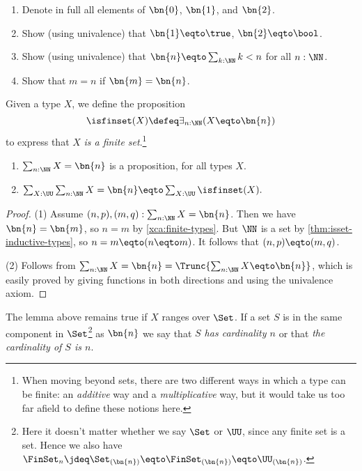 \begin{xca}\label{xca:finite-types}
\hspace{1in}
  \begin{enumerate}
  \item Denote in full all elements of $\bn{0}$, $\bn{1} $, and $\bn{2}$.
  \item Show (using univalence) that $\bn{1} \eqto \true$, $\bn{2} \eqto \bool$.
  \item Show (using univalence) that $\bn{n} \eqto \sum_{k:\NN} k<n$ for all $n:\NN$.
  \item Show that $m=n$ if $\bn{m}=\bn{n}$.\qedhere
  \end{enumerate}
\end{xca}
\begin{definition}\label{def:is-finite}
  Given a type $X$, we define the proposition
  \[
    \textstyle
    \isfinset(X) \defeq \exists_{n:\NN}(X \eqto \bn{n})
  \]
  to express that $X$ \emph{is a finite set}.\footnote{%
    When moving beyond sets, there are two different ways
    in which a type can be finite: an \emph{additive}
    way and a \emph{multiplicative} way, but
    it would take us too far afield to define these notions
    here.} %
\end{definition}
\begin{lemma}\label{lem:maxonefinitetype}
\leavevmode
\begin{enumerate}
  \item $\sum_{n:\NN} X=\bn{n}$ is a proposition, for all types $X$.
  \item
  $\sum_{X:\UU}\sum_{n:\NN} {X=\bn{n}} \eqto \sum_{X:\UU}\isfinset(X).$
  \end{enumerate}
\end{lemma}
\begin{proof}

(1) Assume $(n,p),(m,q): \sum_{n:\NN}{X=\bn{n}}$.
Then we have ${\bn{n}=\bn{m}}$, so ${n=m}$
by \cref{xca:finite-types}. But $\NN$ is a set by \cref{thm:isset-inductive-types},
so ${n=m} \eqto (n \eqto m)$. It follows that $(n,p) \eqto (m,q)$.

(2) Follows from $\sum_{n:\NN} {X=\bn{n}} =\Trunc{\sum_{n:\NN}X \eqto \bn{n}}$,
which is easily proved by giving functions in both directions and using the univalence axiom.
\end{proof}

The lemma above remains true if $X$ ranges over $\Set$.
If a set $S$ is in the same component in $\Set$\footnote{%
  Here it doesn't matter whether we say $\Set$ or $\UU$,
  since any finite set is a set.
  Hence we also have $\FinSet_n
  \jdeq \Set_{(\bn{n})} \eqto \FinSet_{(\bn{n})}
 \eqto \UU_{(\bn{n})}$.}
as $\bn{n}$ we say that \emph{$S$ has cardinality $n$} or that \emph{the cardinality of $S$ is $n$}.

